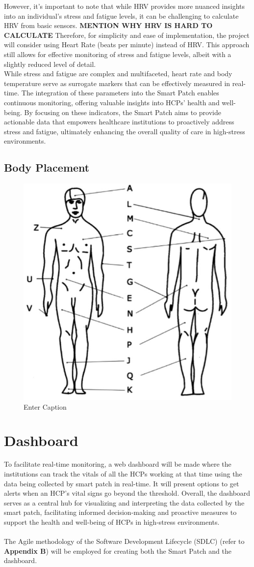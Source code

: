 However, it’s important to note that while HRV provides more nuanced insights into an individual’s stress and fatigue levels, it can be challenging to calculate HRV from basic sensors. \textbf{MENTION WHY HRV IS HARD TO CALCULATE} Therefore, for simplicity and ease of implementation, the project will consider using Heart Rate (beats per minute) instead of HRV. This approach still allows for effective monitoring of stress and fatigue levels, albeit with a slightly reduced level of detail.\\

\noindent While stress and fatigue are complex and multifaceted, heart rate and body temperature serve as surrogate markers that can be effectively measured in real-time. The integration of these parameters into the Smart Patch enables continuous monitoring, offering valuable insights into HCPs’ health and well-being. By focusing on these indicators, the Smart Patch aims to provide actionable data that empowers healthcare institutions to proactively address stress and fatigue, ultimately enhancing the overall quality of care in high-stress environments.

\subsection{Body Placement}
\begin{figure}
    \centering
    \includegraphics[width=0.5\linewidth]{iso-body-temp-sites.png}
    \caption{Enter Caption}
    \label{fig:enter-label}
\end{figure}

\section{Dashboard}
To facilitate real-time monitoring, a web dashboard will be made where the institutions can track the vitals of all the HCPs working at that time using the data being collected by smart patch in real-time. It will present options to get alerts when an HCP’s vital signs go beyond the threshold. Overall,  the dashboard serves as a central hub for visualizing and interpreting the data collected by the smart patch, facilitating informed decision-making and proactive measures to support the health and well-being of HCPs in high-stress environments. \\ \\
The Agile methodology of the Software Development Lifecycle (SDLC) (refer to \textbf{Appendix B}) will be employed for creating both the Smart Patch and the dashboard.

